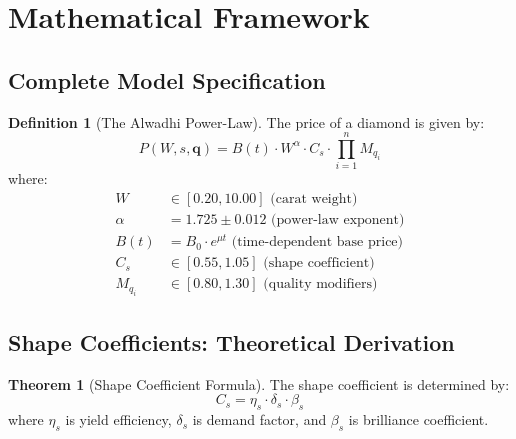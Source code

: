 \documentclass[12pt,a4paper]{article}
\theoremstyle{definition}
\newtheorem{definition}{Definition}
\newtheorem{theorem}{Theorem}
\theoremstyle{remark}
\begin{document}
\section{Mathematical Framework}

\subsection{Complete Model Specification}

\begin{definition}[The Alwadhi Power-Law]
The price of a diamond is given by:
\begin{equation}
P(W, s, \mathbf{q}) = B(t) \cdot W^{\alpha} \cdot C_s \cdot \prod_{i=1}^{n} M_{q_i}
\label{eq:complete_model}
\end{equation}
where:
\begin{align}
W &\in [0.20, 10.00] \text{ (carat weight)} \\
\alpha &= 1.725 \pm 0.012 \text{ (power-law exponent)} \\
B(t) &= B_0 \cdot e^{\mu t} \text{ (time-dependent base price)} \\
C_s &\in [0.55, 1.05] \text{ (shape coefficient)} \\
M_{q_i} &\in [0.80, 1.30] \text{ (quality modifiers)}
\end{align}
\end{definition}

\subsection{Shape Coefficients: Theoretical Derivation}

\begin{theorem}[Shape Coefficient Formula]
The shape coefficient is determined by:
\begin{equation}
C_s = \eta_s \cdot \delta_s \cdot \beta_s
\label{eq:shape_coef}
\end{equation}
where $\eta_s$ is yield efficiency, $\delta_s$ is demand factor, and $\beta_s$ is brilliance coefficient.
\end{theorem}
\end{document}
